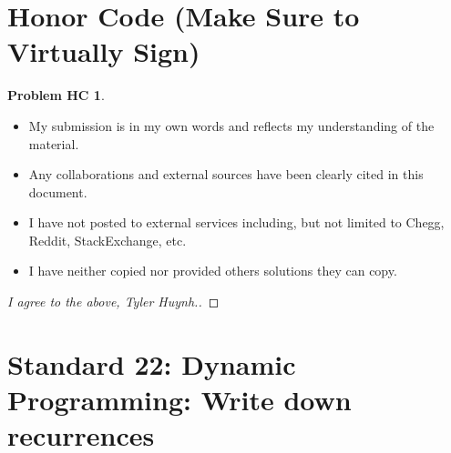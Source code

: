 \documentclass[11pt]{article}
\theoremstyle{definition}
\theoremstyle{definition}
\newtheorem*{requiredHC}{Problem HC}
\theoremstyle{definition}
\begin{document}
\newpage
\section*{Honor Code (Make Sure to Virtually Sign)} \label{HonorCode}
\hypertarget{HonorCode}{}

\begin{requiredHC}
\begin{itemize}
\item My submission is in my own words and reflects my understanding of the material.
\item Any collaborations and external sources have been clearly cited in this document.
\item I have not posted to external services including, but not limited to Chegg, Reddit, StackExchange, etc.
\item I have neither copied nor provided others solutions they can copy.
\end{itemize}

\end{requiredHC}

\begin{proof}[I agree to the above, Tyler Huynh.]
\end{proof}


\newpage
\setcounter{section}{21}
\section{Standard 22: Dynamic Programming: Write down recurrences}
\end{document}
